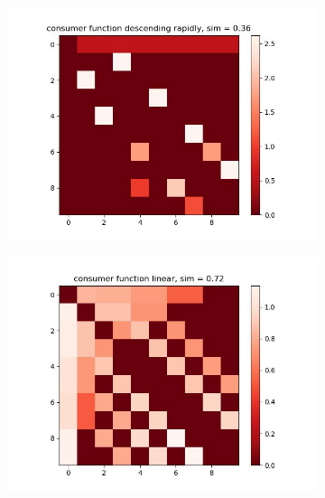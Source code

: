 \documentclass[11pt, letterpaper]{article}
\begin{document}
\begin{figure}[h]
    \centering
\begin{adjustbox}{max width=1.5\textwidth,center}
    \begin{subfigure}[b]{0.45\textwidth}
        \includegraphics[width=\linewidth]{"figures/f/descending rapidly_heatmap.jpg"}
    \end{subfigure}
    \begin{subfigure}[b]{0.45\textwidth}
        \includegraphics[width=\linewidth]{"figures/f/linear_heatmap.jpg"}
    \end{subfigure}
    \begin{subfigure}[b]{0.45\textwidth}

\end{subfigure}
\end{adjustbox}
\end{figure}
\end{document}
